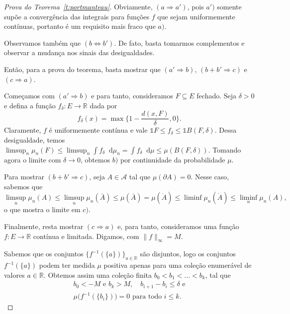 \documentclass[reqno]{article}
\newcommand*\1{\mathds{1}}
\renewcommand*\d{\mathop{}\!\mathrm{d}}
\begin{document}
\begin{proof}[Prova do Teorema~\ref{t:portmanteau}]
  Obviamente, $(a \Rightarrow a')$, pois $a')$ somente supõe a convergência das integrais para funções $f$ que sejam uniformemente contínuas, portanto é um requisito mais fraco que $a)$.

  Observamos também que $(b \Leftrightarrow b')$.
  De fato, basta tomarmos complementos e observar a mudança nos sinais das desigualdades.

  Então, para a prova do teorema, basta mostrar que $(a' \Rightarrow b)$, $(b + b' \Rightarrow c)$ e $(c \Rightarrow a)$.

  Começamos com $(a' \Rightarrow b)$ e para tanto, consideramos $F \subseteq E$ fechado.
  Seja $\delta > 0$ e defina a função $f_\delta: E \to \mathbb{R}$ dada por
  \begin{equation}
    f_\delta (x) = \max \Big\{ 1 - \frac{d(x, F)}{\delta}, 0 \Big\}.
  \end{equation}
  Claramente, $f$ é uniformemente contínua e vale $\1{F} \leq f_\delta \leq \1{B(F,\delta)}$.
  Dessa desigualdade, temos $\limsup_n \mu_n(F) \leq \limsup_n \int f_\delta \d \mu_n = \int f_\delta \d \mu \leq \mu(B(F,\delta))$.
  Tomando agora o limite com $\delta \to 0$, obtemos $b)$ por continuidade da probabilidade $\mu$.


  Para mostrar $(b + b' \Rightarrow c)$, seja $A \in \mathcal{A}$ tal que $\mu(\partial A) = 0$.
  Nesse caso, sabemos que
  \begin{equation*}
    \limsup_n \mu_n(A) \leq \limsup_n \mu_n(\bar A) \leq \mu (\bar A) = \mu (\mathring{A}) \leq \liminf \mu_n (\mathring{A}) \leq \liminf_n \mu_n (A),
  \end{equation*}
  o que mostra o limite em $c)$.

  Finalmente, resta mostrar $(c \Rightarrow a)$ e, para tanto, consideramos uma função $f: E \to \mathbb{R}$ contínua e limitada.
  Digamos, com $\lVert f \rVert_\infty = M$.

  Sabemos que os conjuntos $\{f^{-1}(\{a\})\}_{a \in \mathbb{R}}$ são disjuntos, logo os conjuntos $f^{-1}(\{a\})$ podem ter medida $\mu$ positiva apenas para uma coleção enumerável de valores $a \in \mathbb{R}$.
  Obtemos assim uma coleção finita $b_0 < b_1 < \dots < b_k$, tal que
  \begin{equation}
    \begin{array}{c}
      b_0 < -M \text{ e } b_k > M, \quad b_{i+1} - b_i \leq \delta \text{ e}\\
      \mu\big(f^{-1} (\{b_i\}) \big) = 0 \text{ para todo $i \leq k$}.
    \end{array}
  \end{equation}


\end{proof}
\end{document}
